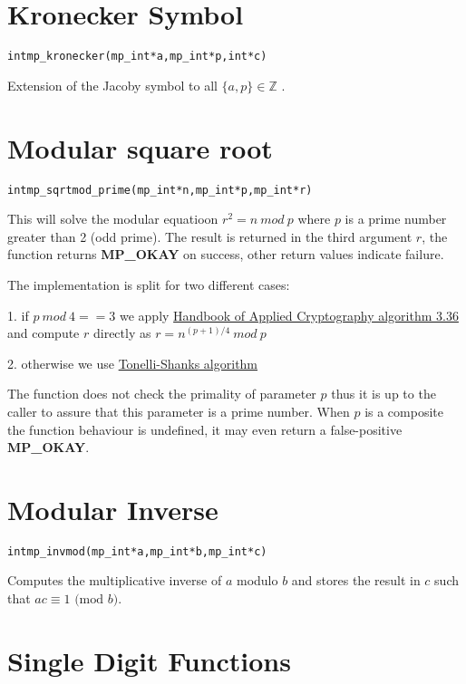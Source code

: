 \documentclass[synpaper]{book}
\def\mod{{\mathit\ mod\ }}
\begin{document}
\section{Kronecker Symbol}
\begin{alltt}
int mp_kronecker (mp_int * a, mp_int * p, int *c)
\end{alltt}
Extension of the Jacoby symbol to all $\lbrace a, p \rbrace \in \mathbb{Z}$ .


\section{Modular square root}
\begin{alltt}
int mp_sqrtmod_prime(mp_int *n, mp_int *p, mp_int *r)
\end{alltt}

This will solve the modular equatioon $r^2 = n \mod p$ where $p$ is a prime number greater than 2 (odd prime).
The result is returned in the third argument $r$, the function returns \textbf{MP\_OKAY} on success,
other return values indicate failure.

The implementation is split for two different cases:

1. if $p \mod 4 == 3$ we apply \href{http://cacr.uwaterloo.ca/hac/}{Handbook of Applied Cryptography algorithm 3.36} and compute $r$ directly as
$r = n^{(p+1)/4} \mod p$

2. otherwise we use \href{https://en.wikipedia.org/wiki/Tonelli-Shanks_algorithm}{Tonelli-Shanks algorithm}

The function does not check the primality of parameter $p$ thus it is up to the caller to assure that this parameter
is a prime number. When $p$ is a composite the function behaviour is undefined, it may even return a false-positive
\textbf{MP\_OKAY}.

\section{Modular Inverse}
\begin{alltt}
int mp_invmod (mp_int * a, mp_int * b, mp_int * c)
\end{alltt}
Computes the multiplicative inverse of $a$ modulo $b$ and stores the result in $c$ such that $ac \equiv 1 \mbox{ (mod }b\mbox{)}$.

\section{Single Digit Functions}
\end{document}
